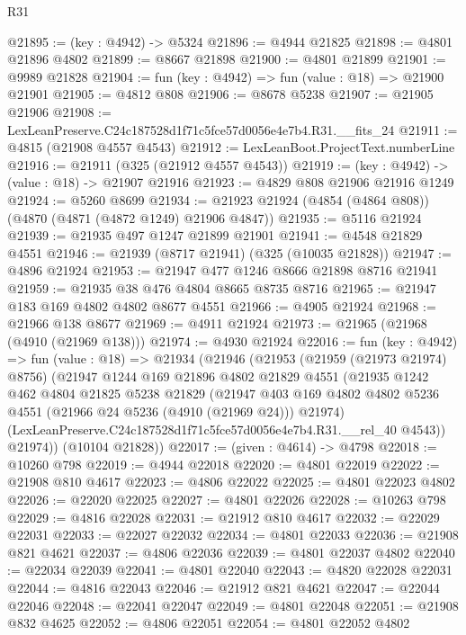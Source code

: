\begin{lexlean}{R31}
\begin{coremodule}
@21895 := (key : @4942) -> @5324
@21896 := @4944 @21825
@21898 := @4801 @21896 @4802
@21899 := @8667 @21898
@21900 := @4801 @21899
@21901 := @9989 @21828
@21904 := fun (key : @4942) => fun (value : @18) => @21900 @21901
@21905 := @4812 @808
@21906 := @8678 @5238
@21907 := @21905 @21906
@21908 := LexLeanPreserve.C24c187528d1f71c5fce57d0056e4e7b4.R31.__fits_24
@21911 := @4815 (@21908 @4557 @4543)
@21912 := LexLeanBoot.ProjectText.numberLine
@21916 := @21911 (@325 (@21912 @4557 @4543))
@21919 := (key : @4942) -> (value : @18) -> @21907 @21916
@21923 := @4829 @808 @21906 @21916 @1249
@21924 := @5260 @8699
@21934 := @21923 @21924 (@4854 (@4864 @808)) (@4870 (@4871 (@4872 @1249) @21906 @4847))
@21935 := @5116 @21924
@21939 := @21935 @497 @1247 @21899 @21901
@21941 := @4548 @21829 @4551
@21946 := @21939 (@8717 @21941) (@325 (@10035 @21828))
@21947 := @4896 @21924
@21953 := @21947 @477 @1246 @8666 @21898 @8716 @21941
@21959 := @21935 @38 @476 @4804 @8665 @8735 @8716
@21965 := @21947 @183 @169 @4802 @4802 @8677 @4551
@21966 := @4905 @21924
@21968 := @21966 @138 @8677
@21969 := @4911 @21924
@21973 := @21965 (@21968 (@4910 (@21969 @138)))
@21974 := @4930 @21924
@22016 := fun (key : @4942) =>
  fun (value : @18) =>
  @21934
    (@21946
      (@21953
        (@21959 (@21973 @21974) @8756)
        (@21947
          @1244
          @169
          @21896
          @4802
          @21829
          @4551
          (@21935
            @1242
            @462
            @4804
            @21825
            @5238
            @21829
            (@21947
              @403
              @169
              @4802
              @4802
              @5236
              @4551
              (@21966 @24 @5236 (@4910 (@21969 @24)))
              @21974)
            (LexLeanPreserve.C24c187528d1f71c5fce57d0056e4e7b4.R31.__rel_40 @4543))
          @21974))
      (@10104 @21828))
@22017 := (given : @4614) -> @4798
@22018 := @10260 @798
@22019 := @4944 @22018
@22020 := @4801 @22019
@22022 := @21908 @810 @4617
@22023 := @4806 @22022
@22025 := @4801 @22023 @4802
@22026 := @22020 @22025
@22027 := @4801 @22026
@22028 := @10263 @798
@22029 := @4816 @22028
@22031 := @21912 @810 @4617
@22032 := @22029 @22031
@22033 := @22027 @22032
@22034 := @4801 @22033
@22036 := @21908 @821 @4621
@22037 := @4806 @22036
@22039 := @4801 @22037 @4802
@22040 := @22034 @22039
@22041 := @4801 @22040
@22043 := @4820 @22028 @22031
@22044 := @4816 @22043
@22046 := @21912 @821 @4621
@22047 := @22044 @22046
@22048 := @22041 @22047
@22049 := @4801 @22048
@22051 := @21908 @832 @4625
@22052 := @4806 @22051
@22054 := @4801 @22052 @4802

\end{coremodule}
\end{lexlean}
